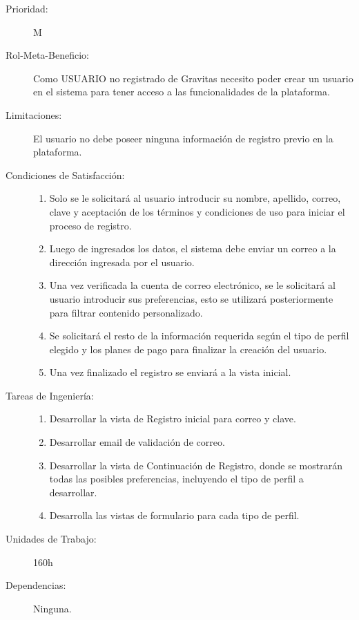 \begin{description}
    \item[Prioridad:] M
    \item[Rol-Meta-Beneficio:] Como USUARIO no registrado de Gravitas necesito poder crear un usuario en el sistema para tener acceso a las funcionalidades de la plataforma.
    \item[Limitaciones:] El usuario no debe poseer ninguna información de registro previo en la plataforma.
    \item[Condiciones de Satisfacción:]
        \begin{enumerate}
            \item Solo se le solicitará al usuario introducir su nombre, apellido, correo, clave y aceptación de los términos y condiciones de uso para iniciar el proceso de registro.
            \item Luego de ingresados los datos, el sistema debe enviar un correo a la dirección ingresada por el usuario.
            \item Una vez verificada la cuenta de correo electrónico, se le solicitará al usuario introducir sus preferencias, esto se utilizará posteriormente para filtrar contenido personalizado.
            \item Se solicitará el resto de la información requerida según el tipo de perfil elegido y los planes de pago para finalizar la creación del usuario.
            \item Una vez finalizado el registro se enviará a la vista inicial.
        \end{enumerate}
    \item[Tareas de Ingeniería:]
        \begin{enumerate}
            \item Desarrollar la vista de Registro inicial para correo y clave.
            \item Desarrollar email de validación de correo.
            \item Desarrollar la vista de Continuación de Registro, donde se mostrarán todas las posibles preferencias, incluyendo el tipo de perfil a desarrollar.
            \item Desarrolla las vistas de formulario para cada tipo de perfil.
        \end{enumerate}
    \item[Unidades de Trabajo:] 160h
    \item[Dependencias:] Ninguna.
\end{description}

